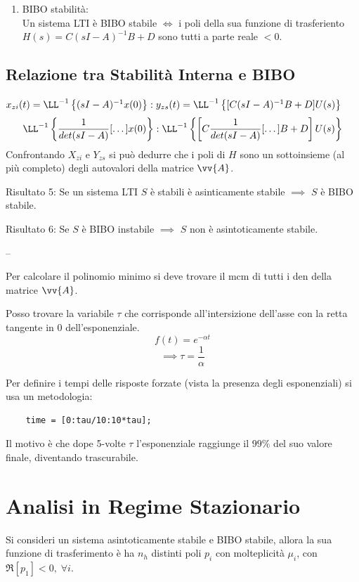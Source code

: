 \documentclass[12pt]{article}
\begin{document}
\begin{enumerate}
\begin{itemize}
            \item Ci sono radici in comune con parte reale nulla. \\
                $ \implies D_Y$ avr\`a radici con parte reale nulla e con molteplcit\`a $> 1 \implies$ \textbf{modi divergenti}.
        \end{itemize}

    \item BIBO stabilit\`a: \\
        Un sistema LTI \`e BIBO stabile $ \iff$ i poli della sua funzione di trasferiento $H(s) = C(sI-A)^{-1}B + D$ sono tutti a parte reale $< 0$.
\end{enumerate}

\subsection{Relazione tra Stabilit\`a Interna e BIBO}
$ x _{zi}(t) = \LL^{-1} \left\{ (sI-A)^{-1}x(0) \right\} : y _{zs}(t) = \LL^{-1} \left\{ [C(sI-A)^{-1}B + D] U(s) \right\} $
\[ \LL^{-1} \left\{ \frac{1}{det(sI-A)} [\dots]x(0) \right\}: \LL^{-1} \left\{ \left[  C\frac{1}{det(sI-A)}[\dots] B + D\right] U(s) \right\}  \]
Confrontando $X _{zi}$ e $Y _{zs}$ si pu\`o dedurre che i poli di $H$ sono un sottoinsieme (al pi\`u completo) degli autovalori della matrice $\vv{A}$.

Risultato 5: Se un sistema LTI $S$ \`e stabili \`e asinticamente stabile $ \implies$ $S$ \`e BIBO stabile.

Risultato 6: Se $S$ \`e BIBO instabile $ \implies$ $S$ non \`e asintoticamente stabile.


--

Per calcolare il polinomio minimo si deve trovare il mcm di tutti i den della matrice $\vv{A}$.


Posso trovare la variabile $\tau$ che corrisponde all'intersizione dell'asse con la retta tangente in 0 dell'esponenziale.
\[ f(t) = e^{-\alpha t} \]
\[ \implies \tau = \frac{1}{\alpha}  \]

Per definire i tempi delle risposte forzate (vista la presenza degli esponenziali) si usa un metodologia:
\begin{verbatim}
    time = [0:tau/10:10*tau];
\end{verbatim}

Il motivo \`e che dope 5-volte $\tau$ l'esponenziale raggiunge il $99\%$ del suo valore finale, diventando trascurabile.


\section{Analisi in Regime Stazionario}
Si consideri un sistema asintoticamente stabile e BIBO stabile, allora la sua funzione di trasferimento \`e ha $n_h$ distinti poli $p_i$ con molteplicit\`a $\mu_i$, con $\Re[p_1] < 0, \;\forall i$.
\end{document}
